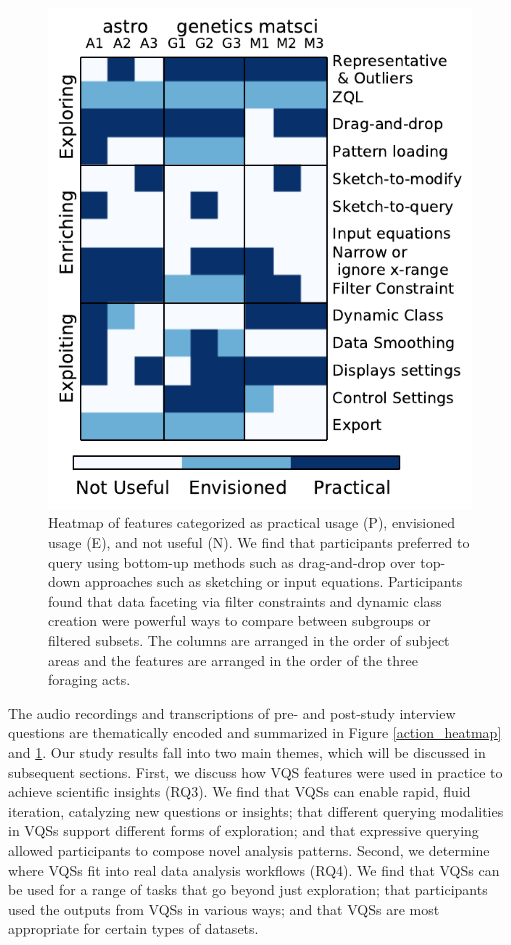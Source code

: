 \begin{figure}[ht!]
    \centering
    \includegraphics[width=0.7\columnwidth]{figures/result2.pdf}
    \vspace{-6pt}\caption{Heatmap of features categorized as practical usage (P), envisioned usage (E), and not useful (N). We find that participants preferred to query using bottom-up methods such as drag-and-drop over top-down approaches such as sketching or input equations. Participants found that data faceting via filter constraints and dynamic class creation were powerful ways to compare between subgroups or filtered subsets. The columns are arranged in the order of subject areas and the features are arranged in the order of the three foraging acts.}
    \label{feature_heatmap}
    \vspace{-5pt}
\end{figure}

\par The audio recordings and transcriptions of pre- and post-study interview questions are thematically encoded and summarized in Figure \ref{action_heatmap} and \ref{feature_heatmap}. Our study results fall into two main themes, which will be discussed in subsequent sections. First, we discuss how VQS features were used in practice to achieve scientific insights (RQ3). We find that VQSs can enable rapid, fluid iteration, catalyzing new questions or insights; that different querying modalities in VQSs support different forms of exploration; and that expressive querying allowed participants to compose novel analysis patterns. Second, we determine where VQSs fit into real data analysis workflows (RQ4). We find that VQSs can be used for a range of tasks that go beyond just exploration; that participants used the outputs from VQSs in various ways; and that VQSs are most appropriate for certain types of datasets.

